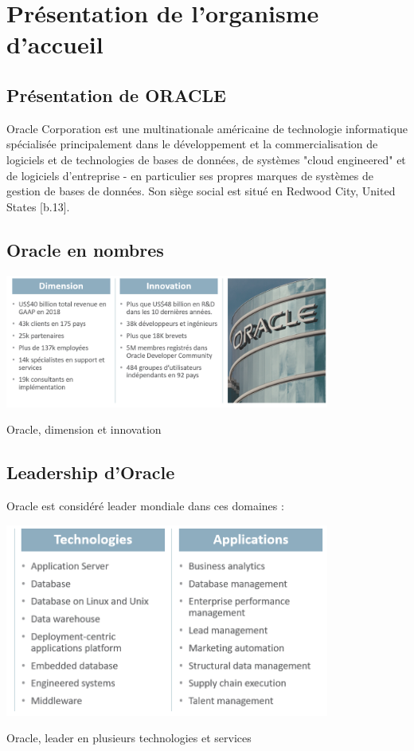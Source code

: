 \section{Présentation de l’organisme d’accueil}
\subsection{Présentation de ORACLE}
Oracle Corporation est une multinationale américaine de technologie informatique spécialisée principalement dans le développement et la commercialisation de logiciels et de technologies de bases de données, de systèmes "cloud engineered" et de logiciels d'entreprise - en particulier ses propres marques de systèmes de gestion de bases de données. Son siège social est situé en Redwood City, United States [b.13].

\subsection{Oracle en nombres}
\begin{table}[h!]  
  \centering
    \includegraphics[width=0.8\textwidth]{chapitre1/Figures/OracleNumbers.PNG}
  \caption{Oracle, dimension et innovation}
\end{table}

\subsection{Leadership d'Oracle}
Oracle est considéré leader mondiale dans ces domaines :
\begin{table}[h!]  
  \centering
    \includegraphics[width=0.8\textwidth]{chapitre1/Figures/OrcaleTechnos.PNG}
  \caption{Oracle, leader en plusieurs technologies et services}
\end{table}

